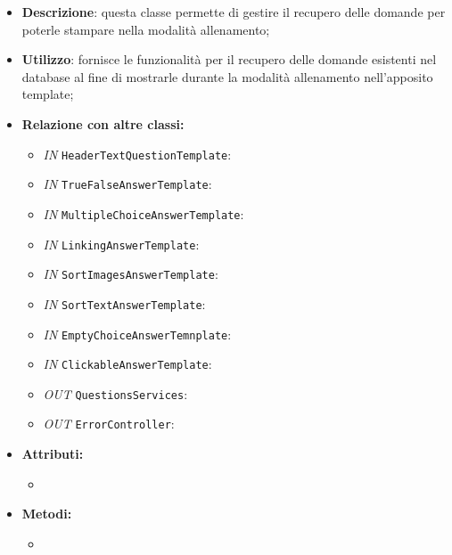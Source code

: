 \begin{itemize}
	\item \textbf{Descrizione}: questa classe permette di gestire il recupero delle domande per poterle stampare nella modalità allenamento;
	\item \textbf{Utilizzo}: fornisce le funzionalità per il recupero delle domande esistenti nel database al fine di mostrarle durante la modalità allenamento nell'apposito template;
	\item \textbf{Relazione con altre classi:}
	\begin{itemize}
		\item \textit{IN} \texttt{HeaderTextQuestionTemplate}:  
		\item \textit{IN} \texttt{TrueFalseAnswerTemplate}:  
		\item \textit{IN} \texttt{MultipleChoiceAnswerTemplate}:  
		\item \textit{IN} \texttt{LinkingAnswerTemplate}:  
		\item \textit{IN} \texttt{SortImagesAnswerTemplate}:  
		\item \textit{IN} \texttt{SortTextAnswerTemplate}:  
		\item \textit{IN} \texttt{EmptyChoiceAnswerTemnplate}:  
		\item \textit{IN} \texttt{ClickableAnswerTemplate}:  
		\item \textit{OUT} \texttt{QuestionsServices}:
		\item \textit{OUT} \texttt{ErrorController}:  
	\end{itemize}
	\item \textbf{Attributi:}
	\begin{itemize}
		\item 
	\end{itemize}
	\item \textbf{Metodi:}
	\begin{itemize}
		\item 
	\end{itemize}
\end{itemize}

